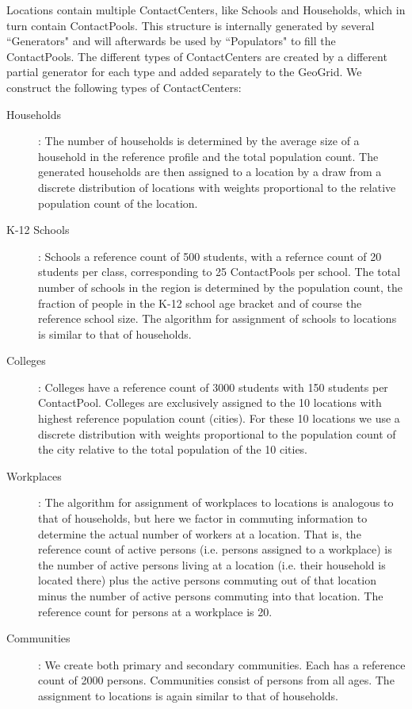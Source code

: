 Locations contain multiple ContactCenters, like Schools and Households, which in turn contain ContactPools.
This structure is internally generated by several ``Generators" and will afterwards be used by ``Populators" to fill the ContactPools. The different types of ContactCenters are created by a different partial generator for each type and added separately to the GeoGrid. We construct the following types of ContactCenters:

\begin{description}
    \item[Households]:
        The number of households is determined by the average size of a household in the reference 
        profile and the total population count.
        The generated households are then assigned to a location by a draw from a discrete distribution of 
        locations with weights proportional to the  relative population count of the location.
    \item[K-12 Schools]:
        Schools a reference count of 500 students, with a refernce count of 20 students per class,
         corresponding to 25 ContactPools per school. 
         The total number of schools in the region is determined by the population count, the fraction 
         of people in the K-12 school age bracket and of course the reference school size.
        The algorithm for assignment of schools to locations is similar to that of households.
    \item[Colleges]:
        Colleges have a reference count of 3000 students with 150 students per ContactPool.
        Colleges are exclusively assigned to the 10 locations with highest reference population count (cities).
        For these 10 locations we use a discrete distribution with weights proportional to the population count 
        of the city relative to the total population of the 10 cities.
    \item[Workplaces]:
        The algorithm for assignment of workplaces to locations is analogous to that of households, 
        but here we factor in commuting information to determine the actual number of workers at a location.
        That is, the reference count of active persons (i.e. persons assigned to a workplace) is 
        the number of active persons living at a location (i.e. their household is located there)
        plus the active persons commuting out of that location minus the number of active persons
        commuting into that location. 
        The reference count for persons at a workplace is 20.
    \item[Communities]:
        We create both primary and secondary communities. Each has a  reference count of 2000 persons. 
        Communities consist of persons from all ages. 
        The assignment to locations is again similar to that of households.
\end{description}

